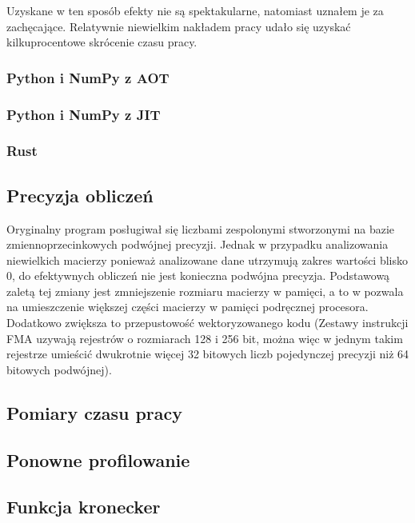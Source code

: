 \documentclass[10pt, a4paper]{article}
\begin{document}
\begin{sloppypar}
    Uzyskane w ten sposób efekty nie są spektakularne, natomiast uznałem je za zachęcające.
    Relatywnie niewielkim nakładem pracy udało się uzyskać kilkuprocentowe skrócenie
    czasu pracy.

    \subsubsection{ Python i NumPy z AOT }


    \subsubsection{ Python i NumPy z JIT }


    \subsubsection{ Rust }


    \subsection{Precyzja obliczeń}


    Oryginalny program posługiwał się liczbami zespolonymi stworzonymi na bazie
    zmiennoprzecinkowych podwójnej precyzji. Jednak w przypadku analizowania niewielkich
    macierzy ponieważ analizowane dane utrzymują zakres wartości blisko 0, do
    efektywnych obliczeń nie jest konieczna podwójna precyzja. Podstawową zaletą tej zmiany
    jest zmniejszenie rozmiaru macierzy w pamięci, a to w pozwala na umieszczenie
    większej części macierzy w pamięci podręcznej procesora. Dodatkowo zwiększa to przepustowość
    wektoryzowanego kodu (Zestawy instrukcji FMA uzywają rejestrów o rozmiarach 128 i
    256 bit, można więc w jednym takim rejestrze umieścić dwukrotnie więcej 32 bitowych liczb
    pojedynczej precyzji niż 64 bitowych podwójnej).

    \subsection{Pomiary czasu pracy}


    \subsection{Ponowne profilowanie}


    \subsection{Funkcja kronecker}



\end{sloppypar}
\end{document}
